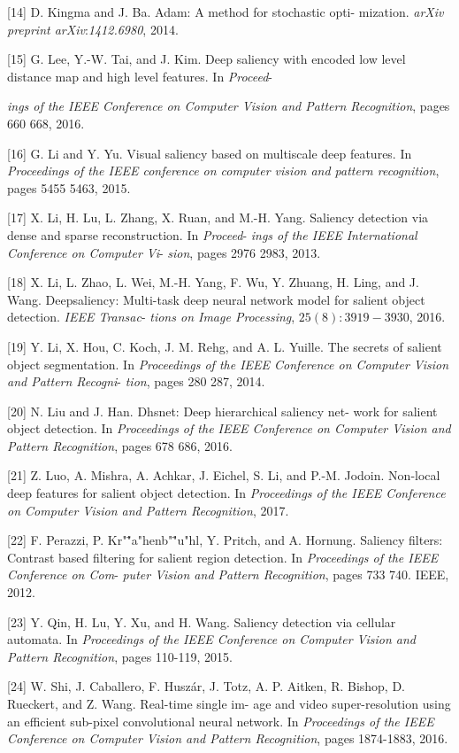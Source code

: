 \documentclass[a4paper,10pt]{article}
\begin{document}
[14] D. Kingma and J. Ba. Adam: A method for stochastic opti- mization. {\it arXiv preprint arXiv}:{\it 1412.6980}, 2014.

[15] G. Lee, Y.-W. Tai, and J. Kim. Deep saliency with encoded low level distance map and high level features. In {\it Proceed}-

{\it ings of the IEEE Conference on Computer Vision and Pattern Recognition}, pages 660 668, 2016.

[16] G. Li and Y. Yu. Visual saliency based on multiscale deep features. In {\it Proceedings of the IEEE conference on computer vision and pattern recognition}, pages 5455 5463, 2015.

[17] X. Li, H. Lu, L. Zhang, X. Ruan, and M.-H. Yang. Saliency detection via dense and sparse reconstruction. In {\it Proceed}- {\it ings of the IEEE International Conference on Computer Vi}- {\it sion}, pages 2976 2983, 2013.

[18] X. Li, L. Zhao, L. Wei, M.-H. Yang, F. Wu, Y. Zhuang, H. Ling, and J. Wang. Deepsaliency: Multi-task deep neural network model for salient object detection. {\it IEEE Transac}- {\it tions on Image Processing}, $25(8):3919-3930$, 2016.

[19] Y. Li, X. Hou, C. Koch, J. M. Rehg, and A. L. Yuille. The secrets of salient object segmentation. In {\it Proceedings of the IEEE Conference on Computer Vision and Pattern Recogni}- {\it tion}, pages 280 287, 2014.

[20] N. Liu and J. Han. Dhsnet: Deep hierarchical saliency net- work for salient object detection. In {\it Proceedings of the IEEE Conference on Computer Vision and Pattern Recognition}, pages 678 686, 2016.

[21] Z. Luo, A. Mishra, A. Achkar, J. Eichel, S. Li, and P.-M. Jodoin. Non-local deep features for salient object detection. In {\it Proceedings of the IEEE Conference on Computer Vision and Pattern Recognition}, 2017.

[22] F. Perazzi, P. Kr"\""{a}"henb"\""{u}"hl, Y. Pritch, and A. Hornung. Saliency filters: Contrast based filtering for salient region detection. In {\it Proceedings of the IEEE Conference on Com}- {\it puter Vision and Pattern Recognition}, pages 733 740. IEEE, 2012.

[23] Y. Qin, H. Lu, Y. Xu, and H. Wang. Saliency detection via cellular automata. In {\it Proceedings of the IEEE Conference on Computer Vision and Pattern Recognition}, pages 110-119, 2015.

[24] W. Shi, J. Caballero, F. Husz\'{a}r, J. Totz, A. P. Aitken, R. Bishop, D. Rueckert, and Z. Wang. Real-time single im- age and video super-resolution using an efficient sub-pixel convolutional neural network. In {\it Proceedings of the IEEE Conference on Computer Vision and Pattern Recognition}, pages 1874-1883, 2016.
\end{document}

